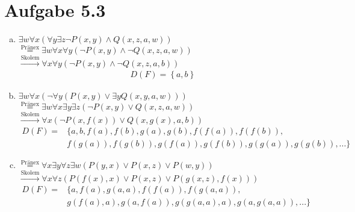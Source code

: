 \documentclass[a4paper,12pt]{article}
\begin{document}
	\section*{Aufgabe 5.3}
	\begin{enumerate}[a)]
		\item $\exists w \forall x \left(\forall y \exists z \lnot P \left(x,y\right) \wedge Q \left(x,z,a,w\right)\right)$\\
		$\overset{\text{Pränex}}{=} \exists w \forall x \forall y \left(\lnot P\left(x,y\right) \wedge \lnot Q \left(x,z,a,w\right)\right)$\\
		$\overset{\text{Skolem}}{\rightarrow} \forall x \forall y \left(\lnot P\left(x,y\right) \wedge \lnot Q \left(x,z,a,b\right)\right)$\\
		\begin{align*}
			D\left(F\right) = \left\lbrace a,b \right\rbrace
		\end{align*}
		
		\item $\exists w \forall x \left(\lnot \forall y \left(P \left(x,y\right) \vee \exists y Q  \left(x,y,a,w\right)\right)\right)$\\
		$\overset{\text{Pränex}}{=} \exists w \forall x \exists y \exists z \left(\lnot P\left(x,y\right) \vee Q \left(x,z,a,w\right)\right)$\\
		$\overset{\text{Skolem}}{\rightarrow} \forall x \left(\lnot P\left(x,f \left(x\right)\right) \vee Q \left(x,g \left(x\right),a,b\right)\right)$\\
		\begin{align*}
			D\left(F\right) = &\text{\{} a,b,f\left(a\right),f\left(b\right),g\left(a\right),g\left(b\right),f\left(f\left(a\right)\right),f\left(f\left(b\right)\right),\\
			&f\left(g\left(a\right)\right),f\left(g\left(b\right)\right),g\left(f\left(a\right)\right),g\left(f\left(b\right)\right),g\left(g\left(a\right)\right),g\left(g\left(b\right)\right),...\text{\}}
		\end{align*}
		
		\item $\overset{\text{Pränex}}{=} \forall x \exists y \forall z \exists w \left( P\left(y,x\right) \vee P\left(x,z\right)\vee P\left(w,y\right)\right)$\\
		$\overset{\text{Skolem}}{\rightarrow} \forall x \forall z \left( P\left(f \left(x\right), x\right) \vee P \left(x,z\right) \vee P \left(g\left(x,z\right),f\left(x\right)\right)\right)$\\
		\begin{align*}
			D\left(F\right) = &\text{\{} a, f\left(a\right), g\left(a,a\right), f\left(f\left(a\right)\right), f\left(g\left(a,a\right)\right),\\
			&g\left(f\left(a\right),a\right), g\left(a, f\left(a\right)\right), g\left(g\left(a,a\right),a\right),g\left(a, g\left(a,a\right)\right),...\text{\}}
		\end{align*}
	\end{enumerate}
\end{document}
